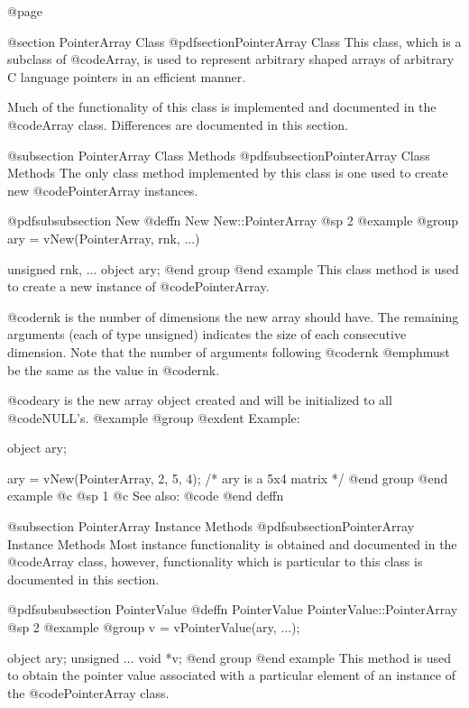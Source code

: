 @page

@section  PointerArray Class
@pdfsection{PointerArray Class}
This class, which is a subclass of @code{Array}, is used to represent
arbitrary shaped arrays of arbitrary C language pointers in an efficient
manner.


Much of the functionality of this class is implemented and documented in
the @code{Array} class.  Differences are documented in this section.



@subsection PointerArray Class Methods
@pdfsubsection{PointerArray Class Methods}
The only class method implemented by this class is one used to create
new @code{PointerArray} instances.






@pdfsubsubsection {New}
@deffn {New} New::PointerArray
@sp 2
@example
@group
ary = vNew(PointerArray, rnk, ...)

unsigned  rnk, ...
object    ary;
@end group
@end example
This class method is used to create a new instance of @code{PointerArray}.

@code{rnk} is the number of dimensions the new array should have.
The remaining arguments (each of type unsigned) indicates the size of
each consecutive dimension.  Note that the number of arguments following
@code{rnk} @emph{must} be the same as the value in @code{rnk}.

@code{ary} is the new array object created and will be initialized to
all @code{NULL}'s.
@example
@group
@exdent Example:

object  ary;

ary = vNew(PointerArray, 2, 5, 4);
/*  ary is a 5x4 matrix  */
@end group
@end example
@c @sp 1
@c See also:  @code{}
@end deffn



@subsection PointerArray Instance Methods
@pdfsubsection{PointerArray Instance Methods}
Most instance functionality is obtained and documented in the @code{Array}
class, however, functionality which is particular to this class is documented
in this section.





@pdfsubsubsection {PointerValue}
@deffn {PointerValue} PointerValue::PointerArray
@sp 2
@example
@group
v = vPointerValue(ary, ...);

object    ary;
unsigned  ...
void      *v;
@end group
@end example
This method is used to obtain the pointer value associated with a
particular element of an instance of the @code{PointerArray} class.

